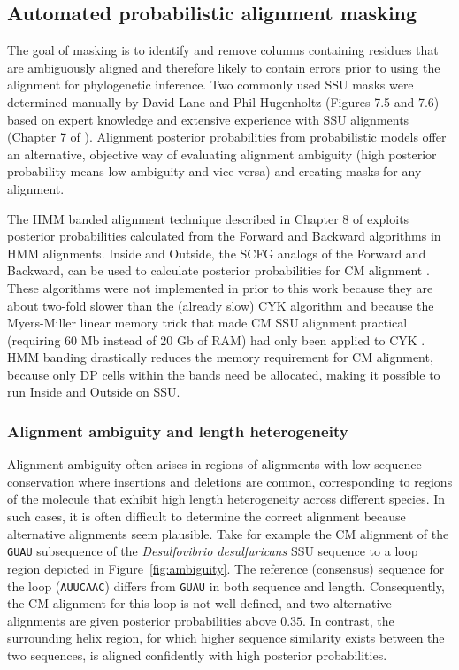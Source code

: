 \subsection{Automated probabilistic alignment masking}

The goal of masking is to identify and remove columns containing
residues that are ambiguously aligned and therefore likely to contain
errors prior to using the alignment for phylogenetic inference.  Two
commonly used SSU masks were determined manually by David Lane and
Phil Hugenholtz (Figures 7.5 and 7.6) based on expert knowledge and extensive
experience with SSU alignments (Chapter 7 of \cite{Nawrocki09b}). Alignment posterior
probabilities from probabilistic models offer an alternative,
objective way of evaluating alignment ambiguity (high posterior
probability means low ambiguity and vice versa) and creating masks for
any alignment.

The HMM banded alignment technique described in Chapter 8 of
\cite{Nawrocki09b} exploits
posterior probabilities calculated from the Forward and Backward
algorithms in HMM alignments. Inside and Outside, the
SCFG analogs of the Forward and Backward, can be used to calculate
posterior probabilities for CM alignment \cite{Durbin98}. These
algorithms were not implemented in  prior to this work
because they are about two-fold slower than the (already slow) CYK
algorithm and because the Myers-Miller linear memory trick that made
CM SSU alignment practical (requiring 60 Mb instead of 20 Gb of RAM)
had only been applied to CYK \cite{Eddy02b}. HMM banding drastically
reduces the memory requirement for CM alignment, because only DP cells
within the bands need be allocated, making it possible to run Inside
and Outside on SSU.

\subsubsection{Alignment ambiguity and length heterogeneity}

Alignment ambiguity often arises in regions of alignments with low
sequence conservation where insertions and deletions are common,
corresponding to regions of the molecule that exhibit high length
heterogeneity across different species. In such cases, it is often
difficult to determine the correct alignment because alternative
alignments seem plausible. Take for example the CM alignment
of the {\tt GUAU} subsequence of the \emph{Desulfovibrio
desulfuricans} SSU sequence to a loop region depicted in
Figure~\ref{fig:ambiguity}. The reference (consensus) sequence for the
loop ({\tt AUUCAAC}) differs from {\tt GUAU} in both sequence and
length. Consequently, the CM alignment for this loop is not well
defined, and two alternative alignments are given posterior
probabilities above $0.35$.  In contrast, the surrounding helix
region, for which higher sequence similarity exists between the two
sequences, is aligned confidently with high posterior probabilities.


